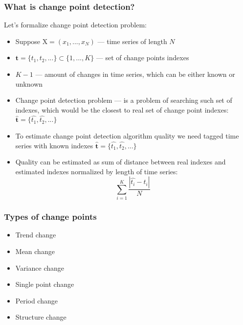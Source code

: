 \documentclass[intlimits, 9pt, unicode]{beamer}
\begin{document}
\begin{frame}
    \frametitle{What is change point detection?}

Let's formalize change point detection problem:
    \begin{itemize}
	\item Suppose $\mathrm{X} = (x_1, ..., x_N)$ --- time series of length $N$
	\item $\mathbf{t} = \{t_1,t_2,...\} \subset \{1,...,K\}$ --- set of change points indexes
	\item $K-1$ --- amount of changes in time series, which can be either known or unknown
	\item Change point detection problem --- is a problem of searching such set of indexes, which would be the closest to real set of change point indexes: $\widehat{\mathbf{t}} = \{\widehat{t_1},\widehat{t_2},...\} $
	\item To estimate change point detection algorithm quality we need tagged time series with known indexes $\widehat{\mathbf{t}} = \{\widehat{t_1},\widehat{t_2},...\} $
	\item Quality can be estimated as sum of distance between real indexes and estimated indexes normalized by length of time series: $$\sum_{i=1}^K \frac{|\widehat{t_i} - t_i|}{N}$$	
	
    \end{itemize}
\end{frame}

\begin{frame}
    \frametitle{Types of change points}

    \begin{itemize}
    	\item Trend change
	\item Mean change
	\item Variance change
	\item Single point change
	\item Period change
	\item Structure change
    \end{itemize}
\end{frame}
\end{document}
